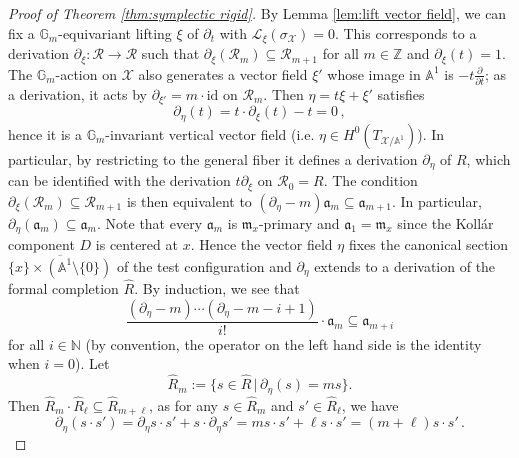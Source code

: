 \documentclass[12pt]{amsart}
\theoremstyle{definition}
\newcommand{\bA}{\mathbb{A}}
\newcommand{\bZ}{\mathbb{Z}}
\newcommand{\bN}{\mathbb{N}}
\newcommand{\bG}{\mathbb{G}}
\newcommand{\cL}{\mathcal{L}}
\newcommand{\cR}{\mathcal{R}}
\newcommand{\scX}{\mathscr{X}}
\newcommand{\fa}{\mathfrak{a}}
\newcommand{\fm}{\mathfrak{m}}
\numberwithin{equation}{section}
\begin{document}
\begin{proof}[Proof of Theorem \ref{thm:symplectic rigid}]
By Lemma \ref{lem:lift vector field}, we can fix a $\bG_m$-equivariant lifting $\xi$ of $\partial_t$ with $\cL_\xi (\sigma_{\scX})=0$. This corresponds to a derivation $\partial_\xi\colon \cR\to \cR$ such that $\partial_\xi(\cR_m)\subseteq \cR_{m+1}$ for all $m\in\bZ$ and $\partial_\xi(t) = 1$. The $\bG_m$-action on $\scX$ also generates a vector field $\xi'$ whose image in $\bA^1$ is $-t\frac{\partial}{\partial t}$; as a derivation, it acts by $\partial_{\xi'}=m\cdot \mathrm{id}$ on $\cR_m$. Then $\eta = t\xi+\xi'$ satisfies 
\[
\partial_\eta(t)= t\cdot \partial_\xi(t)-t=0 \, ,
\]
hence it is a $\bG_m$-invariant vertical vector field (i.e. $\eta\in H^0(T_{\scX/\bA^1})$). In particular, by restricting to the general fiber it defines a derivation $\partial_\eta$ of $R$, which can be identified with the derivation $t\partial_\xi$ on $\cR_0 = R$. The condition $\partial_\xi(\cR_m)\subseteq \cR_{m+1}$ is then equivalent to $(\partial_\eta - m)\fa_m\subseteq \fa_{m+1}$. In particular, $\partial_\eta(\fa_m)\subseteq \fa_m$. Note that every $\fa_m$ is $\fm_x$-primary and $\fa_1=\fm_x$ since the Koll\'ar component $D$ is centered at $x$. Hence the vector field $\eta$ fixes the canonical section $\overline{\{x\}\times (\bA^1\setminus\{0\})}$ of the test configuration and  $\partial_\eta$ extends to a derivation of the formal completion $\widehat{R}$. By induction, we see that
\begin{equation} \label{eq:derivation}
\frac{(\partial_\eta-m)\cdots(\partial_\eta-m-i+1)}{i!}\cdot \fa_m\subseteq \fa_{m+i}    
\end{equation}
for all $i\in\bN$ (by convention, the operator on the left hand side is the identity when $i=0$). Let 
\[
\widehat{R}_m:=\{s\in \widehat{R}\,|\,\partial_\eta(s) = ms\}.
\]
Then $\widehat{R}_m\cdot \widehat{R}_\ell \subseteq \widehat{R}_{m+\ell}$, as for any $s\in \widehat{R}_m $ and $s'\in  \widehat{R}_\ell$, we have 
\[
\partial_\eta(s\cdot s')=\partial_\eta s \cdot s'+s\cdot \partial_\eta s' =ms\cdot s'+\ell s\cdot s'=(m+\ell) s\cdot s'\, .
\]   


\end{proof}
\end{document}
